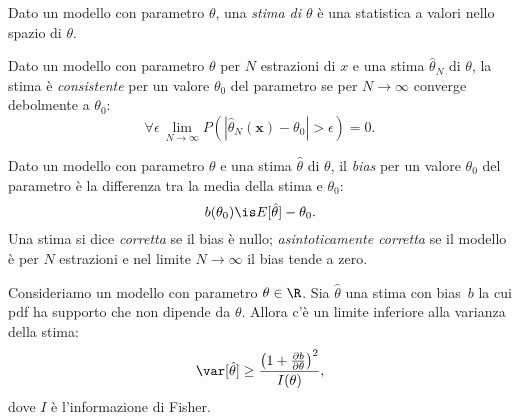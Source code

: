 
\begin{definition}[Stima]
	Dato un modello con parametro $\theta$,
	una \emph{stima di $\theta$} è una statistica a valori nello spazio di $\theta$.
\end{definition}

\begin{definition}[Consistenza]
	Dato un modello con parametro $\theta$ per $N$ estrazioni di $x$
	e una stima $\hat\theta_N$ di $\theta$,
	la stima è \emph{consistente} per un valore $\theta_0$ del parametro
	se per $N\to\infty$ converge debolmente a $\theta_0$:
	\begin{equation*}
		\forall\epsilon\, \lim_{N\to\infty} P(|\hat\theta_N(\mathbf x)-\theta_0| > \epsilon) = 0.
	\end{equation*}
\end{definition}

\begin{definition}[Bias]
	Dato un modello con parametro $\theta$ e una stima $\hat\theta$ di $\theta$,
	il \emph{bias} per un valore $\theta_0$ del parametro è la differenza tra la media della stima e $\theta_0$:
	\begin{equation*}
		b(\theta_0) \is E[\hat\theta] - \theta_0.
	\end{equation*}
	Una stima si dice \emph{corretta} se il bias è nullo;
	\emph{asintoticamente corretta} se il modello è per $N$ estrazioni
	e nel limite $N\to\infty$ il bias tende a zero.
\end{definition}

\begin{theorem}
	Consideriamo un modello con parametro $\theta\in\R$.
	Sia $\hat\theta$ una stima con bias~$b$
	la cui pdf ha supporto che non dipende da $\theta$.
	Allora c'è un limite inferiore alla varianza della stima:
	\begin{equation*}
		\var[\hat\theta] \ge \frac{\left( 1 + \frac{\partial b}{\partial\theta} \right)^2}{I(\theta)},
	\end{equation*}
	dove $I$ è l'informazione di Fisher.
\end{theorem}

